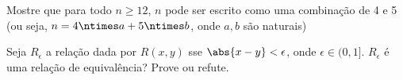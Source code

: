 \begin{exercise}
Mostre que para todo $n \geq 12$, $n$ pode ser escrito como uma combinação de 4 e 5 (ou seja, $n = 4 \ntimes a + 5 \ntimes b$, onde $a, b$ são naturais)
\end{exercise}

\begin{exercise}
Seja $R_\epsilon$ a relação dada por $R(x, y)$ sse $\abs{x - y} < \epsilon$, onde $\epsilon \in (0, 1]$.
$R_\epsilon$ é uma relação de equivalência? Prove ou refute. 
\end{exercise}